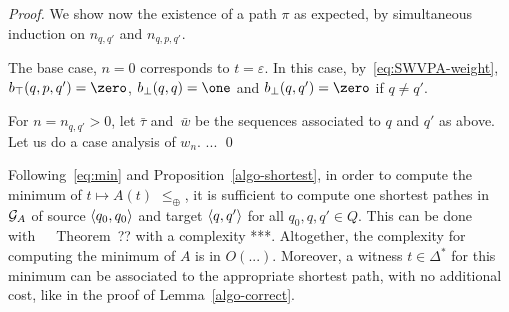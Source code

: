 \begin{proof}
\noindent
We show now the existence of a path $\pi$ as expected, %
by simultaneous induction on $n_{q, q'}$ and $n_{q, p, q'}$.

\noindent
The base case, $n = 0$ corresponds to $t = \varepsilon$. 
In this case, by~\eqref{eq:SWVPA-weight}, $b_\top(q, p, q') = \zero$,
$b_\bot(q, q) = \one$ and $b_\bot(q, q') = \zero$ if $q \neq q'$.

\noindent
For $n = n_{q, q'} > 0$, let $\bar\tau$ and~$\bar{w}$
be the sequences associated to $q$ and $q'$ as above.
Let us do a case analysis of $w_n$.
... \qed
\end{proof}

\medskip\noindent
Following~\eqref{eq:min} and Proposition~\ref{algo-shortest}, 
in order to compute the minimum of $t \mapsto A(t)$ \wrt $\leq_\oplus$, 
it is sufficient to compute one shortest pathes in $\mathcal{G}_{A}$ of source
$\<q_0, q_0>$ and target $\<q, q'>$ for all $q_0, q, q' \in Q$.
This can be done with~~\cite{Mohri02semiring}~Theorem~?? 
with a complexity ***. Altogether, the complexity for computing the minimum of $A$
is in $O(...)$.
Moreover, a witness $t \in \Delta^*$ for this minimum can be associated to the appropriate
shortest path, with no additional cost, like in the proof of Lemma~\ref{algo-correct}.





